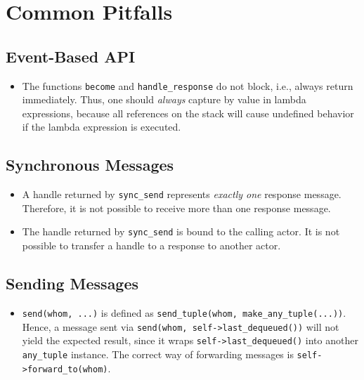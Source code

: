 \section{Common Pitfalls}
\label{Sec::Pitfalls}

\subsection{Event-Based API}

\begin{itemize}
\item The functions \lstinline^become^ and \lstinline^handle_response^ do not block, i.e., always return immediately.
Thus, one should \textit{always} capture by value in lambda expressions, because all references on the stack will cause undefined behavior if the lambda expression is executed.
\end{itemize}

\subsection{Synchronous Messages}

\begin{itemize}

\item
A handle returned by \lstinline^sync_send^ represents \emph{exactly one} response message.
Therefore, it is not possible to receive more than one response message.

\item
The handle returned by \lstinline^sync_send^ is bound to the calling actor.
It is not possible to transfer a handle to a response to another actor.

\end{itemize}

\subsection{Sending Messages}

\begin{itemize}

\item
\lstinline^send(whom, ...)^ is defined as \lstinline^send_tuple(whom, make_any_tuple(...))^.
Hence, a message sent via \lstinline^send(whom, self->last_dequeued())^ will not yield the expected result, since it wraps \lstinline^self->last_dequeued()^ into another \lstinline^any_tuple^ instance.
The correct way of forwarding messages is \lstinline^self->forward_to(whom)^.

\end{itemize}

